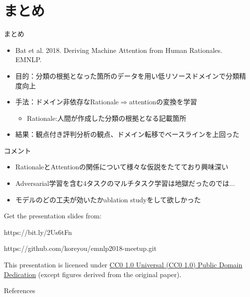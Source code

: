 \section{まとめ}
\frame[standout]{\insertsection}

\begin{frame}{まとめ}
\begin{itemize}
\item Bat et al. 2018. Deriving Machine Attention from Human Rationales. EMNLP.
\item 目的：分類の根拠となった箇所のデータを用い低リソースドメインで分類精度向上
\item 手法：ドメイン非依存なRationale$\Rightarrow$attentionの変換を学習
\begin{itemize}
\item Rationale:人間が作成した分類の根拠となる記載箇所
\end{itemize}
\item 結果：観点付き評判分析の観点、ドメイン転移でベースラインを上回った
\end{itemize}
\end{frame}

\begin{frame}{コメント}
\begin{itemize}
\item RationaleとAttentionの関係について様々な仮説をたてており興味深い
\item Adversarial学習を含む4タスクのマルチタスク学習は地獄だったのでは...
\item モデルのどの工夫が効いたかablation studyをして欲しかった
\end{itemize}

\end{frame}


\begin{frame}[c]

  Get the presentation slides from:

  \begin{center}https://bit.ly/2Us6tFn\end{center}
  \begin{center}https://github.com/koreyou/emnlp2018-meetup.git\end{center}

  This presentation is licensed under
    \href{https://creativecommons.org/publicdomain/zero/1.0/}{
    CC0 1.0 Universal (CC0 1.0) Public Domain Dedication}
    {\scriptsize (except figures derived from the original paper\cite{bao_2018})}.

  \begin{center}\cczero\end{center}

\end{frame}

\begin{frame}[allowframebreaks]{References}
  \printbibliography[heading=none]
\end{frame}



